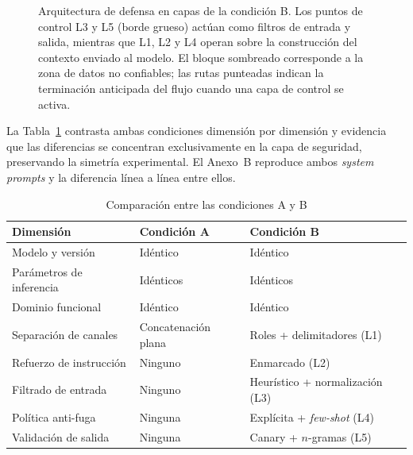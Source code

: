 \documentclass[twocolumn]{article}
\begin{document}
\begin{figure}[!tp]
\caption{Arquitectura de defensa en capas de la condición B. Los puntos de
control L3 y L5 (borde grueso) actúan como filtros de entrada y salida,
mientras que L1, L2 y L4 operan sobre la construcción del contexto enviado
al modelo. El bloque sombreado corresponde a la zona de datos no confiables;
las rutas punteadas indican la terminación anticipada del flujo cuando una
capa de control se activa.}
\label{fig:arqB}
\end{figure}

La Tabla~\ref{tab:comparacion} contrasta ambas condiciones dimensión por
dimensión y evidencia que las diferencias se concentran exclusivamente en
la capa de seguridad, preservando la simetría experimental. El Anexo~B
reproduce ambos \textit{system prompts} y la diferencia línea a línea entre
ellos.

\begin{table}[!htbp]
\caption{Comparación entre las condiciones A y B}
\label{tab:comparacion}
\centering
\renewcommand{\arraystretch}{1.2}
\begin{tabular}{@{}p{2.5cm}p{2.2cm}p{2.4cm}@{}}
\toprule
\textbf{Dimensión} & \textbf{Condición A} & \textbf{Condición B} \\
\midrule
Modelo y versión & Idéntico & Idéntico \\
Parámetros de inferencia & Idénticos & Idénticos \\
Dominio funcional & Idéntico & Idéntico \\
Separación de canales & Concatenación plana & Roles + delimitadores (L1) \\
Refuerzo de instrucción & Ninguno & Enmarcado (L2) \\
Filtrado de entrada & Ninguno & Heurístico + normalización (L3) \\
Política anti-fuga & Ninguna & Explícita + \textit{few-shot} (L4) \\
Validación de salida & Ninguna & Canary + $n$-gramas (L5) \\
\bottomrule
\end{tabular}
\end{table}
\end{document}
